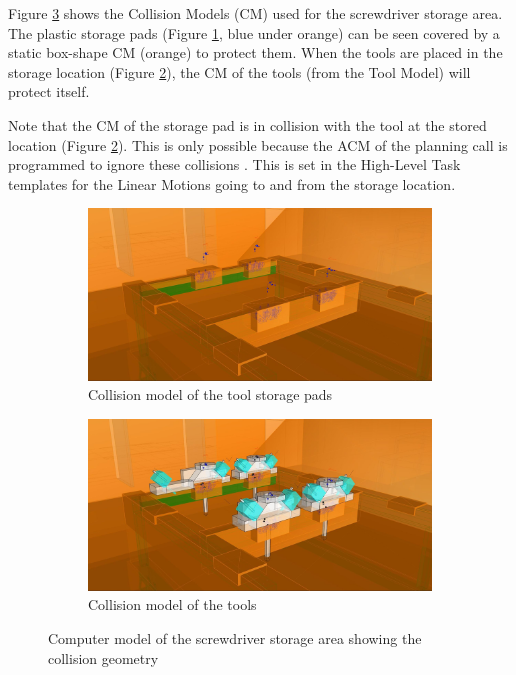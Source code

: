 Figure \ref{fig:cm-screwdriver-hyparhut-pavilion} shows the Collision Models (CM) used for the screwdriver storage area. The plastic storage pads (Figure \ref{fig:cm-tool-storage-pads}, blue under orange) can be seen covered by a static box-shape CM (orange) to protect them. When the tools are placed in the storage location (Figure \ref{fig:cm-tools}), the CM of the tools (from the Tool Model) will protect itself.

Note that the CM of the storage pad is in collision with the tool at the stored location (Figure \ref{fig:cm-tools}). This is only possible because the ACM of the planning call is programmed to ignore these collisions . This is set in the High-Level Task templates  for the Linear Motions going to and from the storage location.

\begin{figure}[!h]
    \centering
    \begin{subfigure}[b]{0.49\textwidth}
        \centering
        \includegraphics[width=\textwidth]{images/7b/img18.jpg}
        \caption{Collision model of the tool storage pads}
        \label{fig:cm-tool-storage-pads}
    \end{subfigure}
    \hfill
    \begin{subfigure}[b]{0.49\textwidth}
        \centering
        \includegraphics[width=\textwidth]{images/7b/img19.jpg}
        \caption{Collision model of the tools}
        \label{fig:cm-tools}
    \end{subfigure}
    \caption{Computer model of the screwdriver storage area showing the collision geometry}
    \label{fig:cm-screwdriver-hyparhut-pavilion}
\end{figure}


